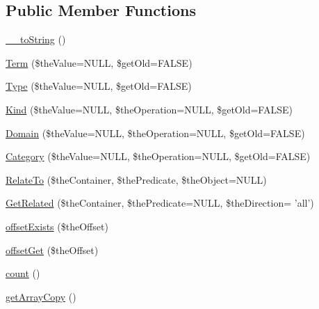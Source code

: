 \subsection*{Public Member Functions}
\begin{DoxyCompactItemize}
\item 
\hyperlink{class_c_ontology_node_ae074c6f51676b4ef5fc3d7fd1c3149af}{\-\_\-\-\_\-to\-String} ()
\item 
\hyperlink{class_c_ontology_node_a2f294a9c93079f58190cedbdd0c09068}{Term} (\$the\-Value=N\-U\-L\-L, \$get\-Old=F\-A\-L\-S\-E)
\item 
\hyperlink{class_c_ontology_node_a23d374948e7f950726d60163db05c154}{Type} (\$the\-Value=N\-U\-L\-L, \$get\-Old=F\-A\-L\-S\-E)
\item 
\hyperlink{class_c_ontology_node_abfe1cb2e10bb53cf7d500c9860e5cb7a}{Kind} (\$the\-Value=N\-U\-L\-L, \$the\-Operation=N\-U\-L\-L, \$get\-Old=F\-A\-L\-S\-E)
\item 
\hyperlink{class_c_ontology_node_ab96f5c462f470348d014ae0efe43005e}{Domain} (\$the\-Value=N\-U\-L\-L, \$the\-Operation=N\-U\-L\-L, \$get\-Old=F\-A\-L\-S\-E)
\item 
\hyperlink{class_c_ontology_node_a414cd8f920944bed65962492ddb9ce2c}{Category} (\$the\-Value=N\-U\-L\-L, \$the\-Operation=N\-U\-L\-L, \$get\-Old=F\-A\-L\-S\-E)
\item 
\hyperlink{class_c_ontology_node_a80910f44a576ccb643571d24f618d70b}{Relate\-To} (\$the\-Container, \$the\-Predicate, \$the\-Object=N\-U\-L\-L)
\item 
\hyperlink{class_c_ontology_node_a73c05b55f31dc210c549faaf7b914761}{Get\-Related} (\$the\-Container, \$the\-Predicate=N\-U\-L\-L, \$the\-Direction= 'all')
\item 
\hyperlink{class_c_ontology_node_af00ed26a322d8f6c97d07a80e8be980d}{offset\-Exists} (\$the\-Offset)
\item 
\hyperlink{class_c_ontology_node_a73a49b503182510cd7451465ee41c6f2}{offset\-Get} (\$the\-Offset)
\item 
\hyperlink{class_c_ontology_node_aa3702123ca5c04ef0f38a011702df49d}{count} ()
\item 
\hyperlink{class_c_ontology_node_a0172babacb8a6d87eef8d6c76a9aa98f}{get\-Array\-Copy} ()
\end{DoxyCompactItemize}
